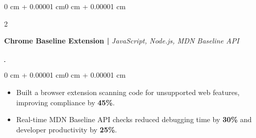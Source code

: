 \documentclass[1pt, letterpaper]{article}
\newenvironment{onecolentry}{
    \begin{adjustwidth}{0 cm + 0.00001 cm}{0 cm + 0.00001 cm}
}{\end{adjustwidth}}
\newenvironment{twocolentry}[2][]{
    \onecolentry
    \def\secondColumn{#2}
    \setcolumnwidth{\fill, 4.5 cm}
    \begin{paracol}{2}
}{
    \switchcolumn \raggedleft \secondColumn
    \end{paracol}
    \endonecolentry
}
\let\hrefWithoutArrow\href
\begin{document}
    \begin{twocolentry}{
        {\hrefWithoutArrow{https://github.com/madhesh60/Baseline-Extension}{\,\faExternalLink*}}%
    }
        \vspace{-3pt}
        \textbf{Chrome Baseline Extension |} \textit{JavaScript, Node.js, MDN Baseline API}
    \end{twocolentry}
    \begin{onecolentry}
        \vspace{0mm}
        \begin{itemize}
            \setlength{\itemsep}{-0.8pt}
            \setlength{\parsep}{-0.8pt}
            \item Built a browser extension scanning code for unsupported web features, improving compliance by \textbf{45\%}.
            \item Real-time MDN Baseline API checks reduced debugging time by \textbf{30\%} and developer productivity by \textbf{25\%}.
        \end{itemize}
    \end{onecolentry}
    \vspace{1.5mm}
\end{document}
